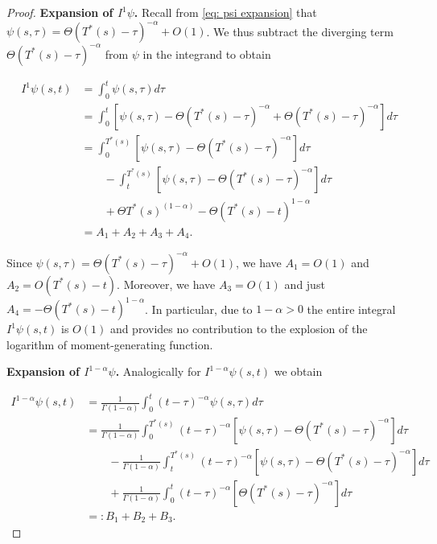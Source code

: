 \documentclass[12pt,twoside]{article}
\theoremstyle{plain}
\theoremstyle{plain}
\theoremstyle{definition}
\theoremstyle{remark}
\numberwithin{equation}{section}
\begin{document}
\begin{proof}

\textbf{Expansion of $I^1\psi$.} Recall from \eqref{eq: psi expansion} that $\psi(s,\tau) = \Theta(T^*(s)-\tau)^{-\alpha} + O(1)$. We thus subtract the diverging term $\Theta(T^*(s)-\tau)^{-\alpha}$ from $\psi$ in the integrand to obtain

\begin{equation}\label{i1expansion}
\begin{aligned}
I^1\psi(s,t) &= \int _0 ^t \psi(s, \tau) d\tau\\[10pt]
&= \int _0^t\left[\psi(s,\tau) - \Theta (T^*(s)-\tau)^{-\alpha} + \Theta(T^*(s)-\tau)^{-\alpha}\right] d\tau\\[10pt]
&= \int _0^{T^*(s)} \left[\psi(s,\tau)  - \Theta(T^*(s)-\tau)^{-\alpha}\right] d\tau \\[10pt]
&\qquad-\int _t^{T^*(s)} \left[\psi(s,\tau)  - \Theta(T^*(s)-\tau)^{-\alpha}\right] d\tau \\[10pt]
&\qquad+ \Theta T^{*}(s)^{(1-\alpha)} - \Theta (T^*(s)-t)^{1-\alpha}\\[10pt]
&=A_1+A_2+A_3+A_4.
\end{aligned}
\end{equation}

Since $\psi(s,\tau) = \Theta(T^*(s)-\tau)^{-\alpha} + O(1)$, we have $A_1 = O(1)$ and $A_2 = O(T^*(s) - t)$. Moreover, we have $A_3=O(1)$ and just $A_4=-\Theta(T^*(s)-t)^{1-\alpha}$. In particular, due to $1 - \alpha > 0$ the entire integral $I^1\psi(s,t)$ is $O(1)$ and provides no contribution to the explosion of the logarithm of moment-generating function.

\newpage\clearpage

\textbf{Expansion of $I^{1-\alpha}\psi$.} Analogically for $I^{1-\alpha}\psi(s,t)$ we obtain

\begin{equation} \label{i1alphaexpansion}
\begin{aligned}
I^{1-\alpha}\psi(s,t) &= \frac{1}{\Gamma(1-\alpha)} \int _0 ^t (t-\tau)^{-\alpha} \psi(s, \tau) d\tau\\[10pt]
&= \frac{1}{\Gamma(1-\alpha)} \int _0^{T^*(s)}(t-\tau)^{-\alpha}\left[\psi(s,\tau) - \Theta (T^*(s)-\tau)^{-\alpha} \right] d\tau\\
&\qquad-\frac{1}{\Gamma(1-\alpha)} \int _t^{T^*(s)}(t-\tau)^{-\alpha}\left[\psi(s,\tau) - \Theta (T^*(s)-\tau)^{-\alpha} \right] d\tau\\
&\qquad + \frac{1}{\Gamma(1-\alpha)} \int _0^t(t-\tau)^{-\alpha}\left[\Theta(T^*(s)-\tau)^{-\alpha}\right] d\tau\\[10pt]
&=:B_1+B_2+B_3.
\end{aligned}
\end{equation}


\end{proof}
\end{document}
